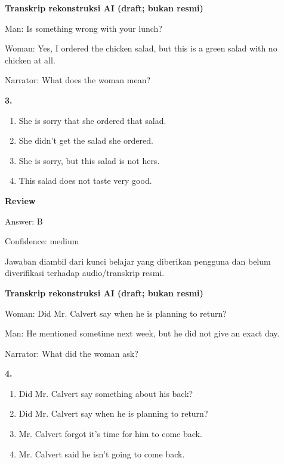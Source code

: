 \documentclass[12pt]{article}
\begin{document}
\par
\vspace{0.25\baselineskip}
\begin{exampleblock}
\textbf{Transkrip rekonstruksi AI (draft; bukan resmi)}\par
Man: Is something wrong with your lunch?\par
Woman: Yes, I ordered the chicken salad, but this is a green salad with no chicken at all.\par
Narrator: What does the woman mean?\par
\end{exampleblock}
\noindent\textbf{3.}
\begin{enumerate}[label=(\Alph*),leftmargin=*,itemsep=0.2em]
\item She is sorry that she ordered that salad.
\item She didn't get the salad she ordered.
\item She is sorry, but this salad is not hers.
\item This salad does not taste very good.
\end{enumerate}
\par
\begingroup
\setlength{\parskip}{0pt}
\setlength{\parindent}{0pt}
\textbf{Review}\par
Answer: B\par
Confidence: medium\par
Jawaban diambil dari kunci belajar yang diberikan pengguna dan belum diverifikasi terhadap audio/transkrip resmi.\par
\endgroup
\par
\vspace{0.25\baselineskip}
\begin{exampleblock}
\textbf{Transkrip rekonstruksi AI (draft; bukan resmi)}\par
Woman: Did Mr. Calvert say when he is planning to return?\par
Man: He mentioned sometime next week, but he did not give an exact day.\par
Narrator: What did the woman ask?\par
\end{exampleblock}
\noindent\textbf{4.}
\begin{enumerate}[label=(\Alph*),leftmargin=*,itemsep=0.2em]
\item Did Mr. Calvert say something about his back?
\item Did Mr. Calvert say when he is planning to return?
\item Mr. Calvert forgot it's time for him to come back.
\item Mr. Calvert said he isn't going to come back.
\end{enumerate}
\end{document}
